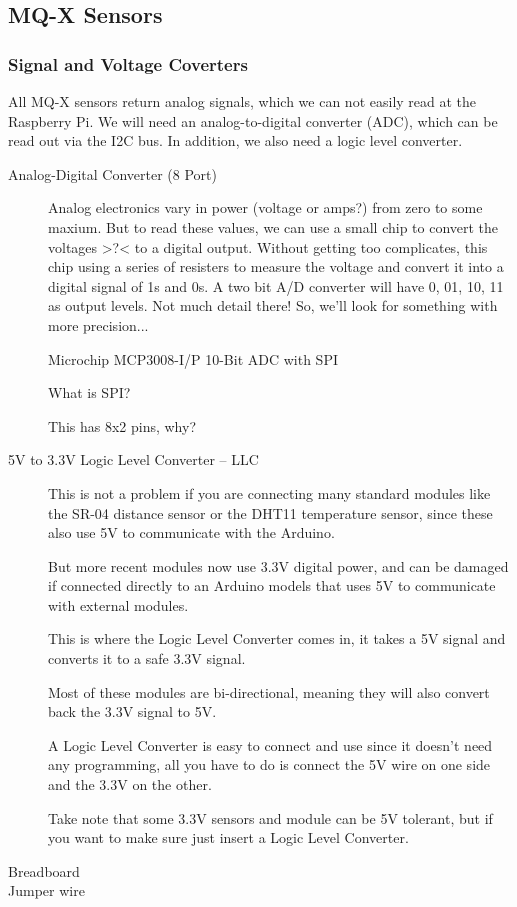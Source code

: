 \documentclass{article}\usepackage[]{graphicx}\usepackage[]{color}
\begin{document}
\subsection{MQ-X Sensors}

\subsubsection{Signal and Voltage Coverters}

All MQ-X sensors return analog signals, which we can not easily read at the Raspberry Pi. We will need an analog-to-digital converter (ADC), which can be read out via the I2C bus. In addition, we also need a logic level converter.

\begin{description}
\item[Analog-Digital Converter (8 Port)] Analog electronics vary in power (voltage or amps?) from zero to some maxium. But to read these values, we can use a small chip to convert the voltages >?< to a digital output. Without getting too complicates, this chip using a series of resisters to measure the voltage and convert it into a digital signal of 1s and 0s. A two bit A/D converter will have 0, 01, 10, 11 as output levels. Not much detail there!  So, we'll look for something with more precision...

Microchip MCP3008-I/P 10-Bit ADC with SPI  

What is SPI?

This has 8x2 pins, why?

\item[5V to 3.3V Logic Level Converter -- LLC] This is not a problem if you are connecting many standard modules like the SR-04 distance sensor or the DHT11 temperature sensor, since these also use 5V to communicate with the Arduino.

But more recent modules now use 3.3V digital power, and can be damaged if connected directly to an Arduino models that uses 5V to communicate with external modules.

This is where the Logic Level Converter comes in, it takes a 5V signal and converts it to a safe 3.3V signal.

Most of these modules are bi-directional, meaning they will also convert back the 3.3V signal to 5V.

A Logic Level Converter is easy to connect and use since it doesn’t need any programming, all you have to do is connect the 5V wire on one side and the 3.3V on the other.

Take note that some 3.3V sensors and module can be 5V tolerant, but if you want to make sure just insert a Logic Level Converter.

\item[Breadboard]
\item[Jumper wire]
\end{description}
\end{document}
